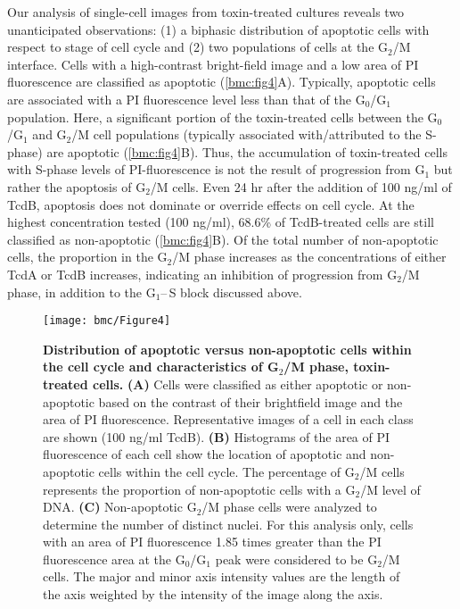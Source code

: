 Our analysis of single-cell images from toxin-treated cultures reveals two unanticipated observations: (1) a biphasic distribution of apoptotic cells with respect to stage of cell cycle and (2) two populations of cells at the G$_{\text{2}}$/M interface.  Cells with a high-contrast bright-field image and a low area of PI fluorescence are classified as apoptotic (\autoref{bmc:fig4}A). Typically, apoptotic cells are associated with a PI fluorescence level less than that of the G$_{\text{0}}$/G$_{\text{1}}$ population.  Here, a significant portion of the toxin-treated cells between the G$_{\text{0}}$/G$_{\text{1}}$ and G$_{\text{2}}$/M cell populations (typically associated with/attributed to the S-phase) are apoptotic (\autoref{bmc:fig4}B). Thus, the accumulation of toxin-treated cells with S-phase levels of PI-fluorescence is not the result of progression from G$_{\text{1}}$ but rather the apoptosis of G$_{\text{2}}$/M cells. Even 24 hr after the addition of 100 ng/ml of TcdB, apoptosis does not dominate or override effects on cell cycle. At the highest concentration tested (100 ng/ml), 68.6\% of TcdB-treated cells are still classified as non-apoptotic (\autoref{bmc:fig4}B). Of the total number of non-apoptotic cells, the proportion in the G$_{\text{2}}$/M phase increases as the concentrations of either TcdA or TcdB increases, indicating an inhibition of progression from G$_{\text{2}}$/M phase, in addition to the G$_{\text{1}}$--\,S block discussed above.


\begin{figure}[h!]
  \centering
  \texttt{[image: bmc/Figure4]}
  \caption[Distribution of apoptotic versus non-apoptotic cells within the cell cycle and characteristics of G$_{\text{2}}$/M phase, toxin-treated cells]{
  \textbf{Distribution of apoptotic versus non-apoptotic cells within the cell cycle and characteristics of G$_{\text{2}}$/M phase, toxin-treated cells.}
\textbf{(A)} Cells were classified as either apoptotic or non-apoptotic based on the contrast of their brightfield image and the area of PI fluorescence. Representative images of a cell in each class are shown (100 ng/ml TcdB). 
\textbf{(B)} Histograms of the area of PI fluorescence of each cell show the location of apoptotic and non-apoptotic cells within the cell cycle. The percentage of G$_{\text{2}}$/M cells represents the proportion of non-apoptotic cells with a G$_{\text{2}}$/M level of DNA.
\textbf{(C)} Non-apoptotic G$_{\text{2}}$/M phase cells were analyzed to determine the number of distinct nuclei. For this analysis only, cells with an area of PI fluorescence 1.85 times greater than the PI fluorescence area at the G$_{\text{0}}$/G$_{\text{1}}$ peak were considered to be G$_{\text{2}}$/M cells. The major and minor axis intensity values are the length of the axis weighted by the intensity of the image along the axis.
}
  \label{bmc:fig4}
\end{figure}


